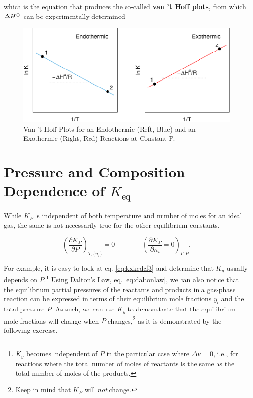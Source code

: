 \documentclass[
  9pt,
]{extbook}
\theoremstyle{definition}
\theoremstyle{definition}
\theoremstyle{definition}
\theoremstyle{remark}
\begin{document}
which is the equation that produces the so-called \textbf{van 't Hoff plots}, from which \(\Delta H^{-\kern-6pt{\ominus}\kern-6pt-}\) can be experimentally determined:

\begin{figure}

{\centering \includegraphics{pchem1_files/figure-latex/vthoffplt-1} 

}

\caption{Van 't Hoff Plots for an Endothermic (Reft, Blue) and an Exothermic (Right, Red) Reactions at Constant P.}\label{fig:vthoffplt}
\end{figure}

\hypertarget{pressure-and-composition-dependence-of-k_texteq}{%
\section{\texorpdfstring{Pressure and Composition Dependence of \(K_{\text{eq}}\)}{Pressure and Composition Dependence of K\_\{\textbackslash text\{eq\}\}}}\label{pressure-and-composition-dependence-of-k_texteq}}

While \(K_P\) is independent of both temperature and number of moles for an ideal gas, the same is not necessarily true for the other equilibrium constants.

\begin{equation}
\left( \frac{\partial K_P}{\partial P} \right)_{T,\{n_i\}} = 0 \qquad \qquad \left( \frac{\partial K_P}{\partial n_i}=0 \right)_{T,P}.
\label{eq:kppni}
\end{equation}

For example, it is easy to look at eq. \eqref{eq:kxkcdef3} and determine that \(K_y\) usually depends on \(P\).\footnote{\(K_y\) becomes independent of \(P\) in the particular case where \(\Delta \nu=0\), i.e., for reactions where the total number of moles of reactants is the same as the total number of moles of the products.} Using Dalton's Law, eq. \eqref{eq:daltonlaw}, we can also notice that the equilibrium partial pressures of the reactants and products in a gas-phase reaction can be expressed in terms of their equilibrium mole fractions \(y_i\) and the total pressure \(P\). As such, we can use \(K_y\) to demonstrate that the equilibrium mole fractions will change when \(P\) changes,\footnote{Keep in mind that \(K_P\) will \emph{not} change.} as it is demonstrated by the following exercise.
\end{document}
